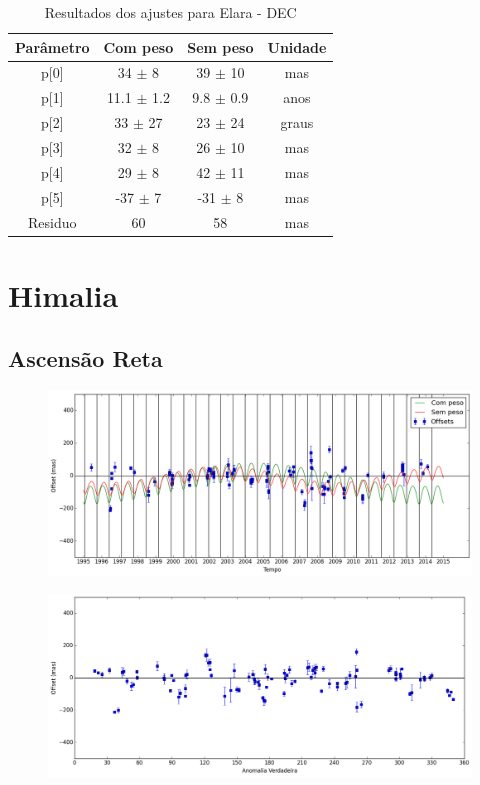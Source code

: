 \documentclass[11pt,a4paper]{report}
\begin{document}
\begin{table}[h!]
\caption{\label{Tab: Elara-DEC} Resultados dos ajustes para Elara - DEC}
\begin{centering}
\begin{tabular}{cccc}
\hline
\hline
Parâmetro & Com peso & Sem peso & Unidade\tabularnewline
\hline
p[0] & 34 $\pm$ 8 & 39 $\pm$ 10 & mas\\
p[1] & 11.1 $\pm$ 1.2 & 9.8 $\pm$ 0.9 & anos\\
p[2] & 33 $\pm$ 27 & 23 $\pm$ 24 & graus\\
p[3] & 32 $\pm$ 8 & 26 $\pm$ 10 & mas\\
p[4] & 29 $\pm$ 8 & 42 $\pm$ 11 & mas\\
p[5] & -37 $\pm$ 7 & -31 $\pm$ 8 & mas\\
Residuo & 60 & 58 & mas\\
\hline 
\end{tabular} 
\par\end{centering}
\end{table}

\chapter*{Himalia}
\section*{Ascensão Reta}

\begin{figure}[h]
\includegraphics[scale=0.45]{Himalia/RA.png} 
\end{figure}

\begin{figure}[h]
\includegraphics[scale=0.45]{Himalia/RA_anom.png}  
\end{figure}
\end{document}
